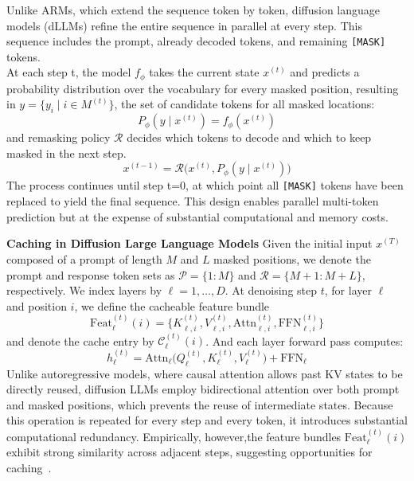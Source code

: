 Unlike ARMs, which extend the sequence token by token, diffusion language models (dLLMs) refine the entire sequence in parallel at every step. This sequence includes the prompt, already decoded tokens, and remaining \texttt{[MASK]} tokens. \\
At each step t, the model $f_\phi$ takes the current state $x 
^{(t)}$ and predicts a probability distribution over the vocabulary for every masked position, resulting in $y = \{y_i \mid i \in M^{(t)}\}$, the set of candidate tokens for all masked locations:
\begin{equation}
P_\phi(y \mid x^{(t)}) = f_\phi(x^{(t)})
\end{equation}
and remasking policy $\mathcal{R}$ decides which tokens to decode and which to keep masked in the next step.
\begin{equation}
x^{(t-1)} = \mathcal{R}\big(x^{(t)}, P_\phi(y \mid x^{(t)})\big)
\end{equation}
The process continues until step t=0, at which point all \texttt{[MASK]} tokens have been replaced to yield the final sequence. 
This design enables parallel multi-token prediction but at the expense of substantial computational and memory costs. 

\noindent \textbf{Caching in Diffusion Large Language Models }
Given the initial input $x^{(T)}$ composed of a prompt of length $M$ and $L$ masked positions, we denote the prompt and response token sets as $\mathcal{P}=\{1\!:\!M\}$ and $\mathcal{R}=\{M\!+\!1\!:\!M\!+\!L\}$, respectively. We index layers by $\ell=1,\ldots,D$. At denoising step $t$, for layer $\ell$ and position $i$, we define the cacheable feature bundle 
\begin{equation}
\mathrm{Feat}_{\ell}^{(t)}(i)
= \{ K_{\ell,i}^{(t)}, V_{\ell,i}^{(t)}, \mathrm{Attn}_{\ell,i}^{(t)}, \mathrm{FFN}_{\ell,i}^{(t)} \}
\end{equation}
and denote the cache entry by $\mathcal{C}_{\ell}^{(t)}(i)$. And each layer forward pass computes:
\begin{equation}
  h_{\ell}^{(t)} 
  = \mathrm{Attn}_{\ell}\!\bigl(Q_{\ell}^{(t)}, K_{\ell}^{(t)}, V_{\ell}^{(t)}\bigr)
  + \mathrm{FFN}_{\ell}
  \label{eq:layer_forward}
\end{equation}
Unlike autoregressive models, where causal attention allows past KV states to be directly reused, diffusion LLMs employ bidirectional attention over both prompt and masked positions, which prevents the reuse of intermediate states. Because this operation is repeated for every step and every token, it introduces substantial computational redundancy. Empirically, however,the feature bundles $\mathrm{Feat}_{\ell}^{(t)}(i)$ exhibit strong similarity across adjacent steps, suggesting opportunities for caching~\citep{liu2025dllm,wu2025fast,ma2025dkv,hu2025accelerating}.

